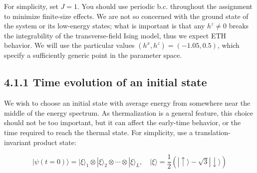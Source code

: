 \documentclass[12pt]{article}
\begin{document}
For simplicity, set $J=1$. You should use periodic b.c. throughout the assignment to minimize finite-size effects. We are not so concerned with the ground state of the system or its low-energy states; what is important is that any $h^{z} \neq 0$ breaks the integrability of the transverse-field Ising model, thus we expect ETH behavior. We will use the particular values $\left(h^{x}, h^{z}\right)=(-1.05,0.5)$, which specify a sufficiently generic point in the parameter space.

\subsection*{4.1.1 Time evolution of an initial state}
We wish to choose an initial state with average energy from somewhere near the middle of the energy spectrum. As thermalization is a general feature, this choice should not be too important, but it can affect the early-time behavior, or the time required to reach the thermal state. For simplicity, use a translation-invariant product state:


\begin{equation*}
|\psi(t=0)\rangle=|\xi\rangle_{1} \otimes|\xi\rangle_{2} \otimes \cdots \otimes|\xi\rangle_{L}, \quad|\xi\rangle=\frac{1}{2}(|\uparrow\rangle-\sqrt{3}|\downarrow\rangle) \tag{9}
\end{equation*}
\end{document}
